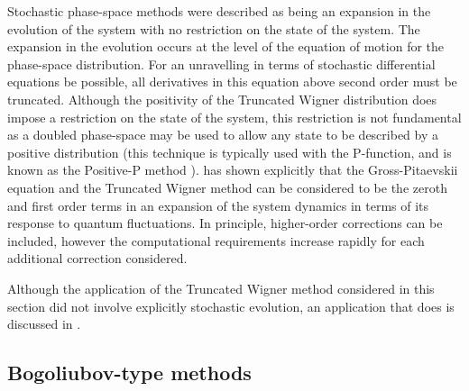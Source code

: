 Stochastic phase-space methods were described as being an expansion in the evolution of the system with no restriction on the state of the system.  The expansion in the evolution occurs at the level of the equation of motion for the phase-space distribution.  For an unravelling in terms of stochastic differential equations be possible, all derivatives in this equation above second order must be truncated.  Although the positivity of the Truncated Wigner distribution does impose a restriction on the state of the system, this restriction is not fundamental as a doubled phase-space may be used to allow any state to be described by a positive distribution (this technique is typically used with the P-function, and is known as the Positive-P method \citep{GardinerQN}).  \citet{Polkovnikov:2003} has shown explicitly that the Gross-Pitaevskii equation and the Truncated Wigner method can be considered to be the zeroth and first order terms in an expansion of the system dynamics in terms of its response to quantum fluctuations.  In principle, higher-order corrections can be included, however the computational requirements increase rapidly for each additional correction considered.

Although the application of the Truncated Wigner method considered in this section did not involve explicitly stochastic evolution, an application that does is discussed in .

\subsection{Bogoliubov-type methods}
\label{BackgroundTheory:BogoliubovMethods}

